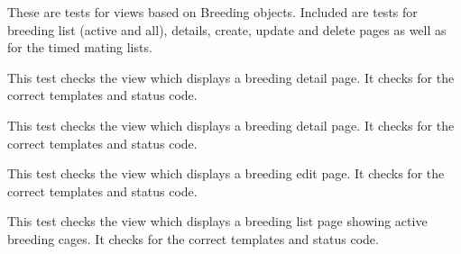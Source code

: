\documentclass[letterpaper,10pt,english]{sphinxmanual}
\begin{document}
\begin{fulllineitems}
\label{animals:mousedb.animal.tests.BreedingViewTests}
These are tests for views based on Breeding objects.  Included are tests for breeding list (active and all), details, create, update and delete pages as well as for the timed mating lists.

\begin{fulllineitems}
\label{animals:mousedb.animal.tests.BreedingViewTests.test_breeding_delete}
This test checks the view which displays a breeding detail page.  It checks for the correct templates and status code.

\end{fulllineitems}


\begin{fulllineitems}
\label{animals:mousedb.animal.tests.BreedingViewTests.test_breeding_detail}
This test checks the view which displays a breeding detail page.  It checks for the correct templates and status code.

\end{fulllineitems}


\begin{fulllineitems}
\label{animals:mousedb.animal.tests.BreedingViewTests.test_breeding_edit}
This test checks the view which displays a breeding edit page.  It checks for the correct templates and status code.

\end{fulllineitems}


\begin{fulllineitems}
\label{animals:mousedb.animal.tests.BreedingViewTests.test_breeding_list}
This test checks the view which displays a breeding list page showing active breeding cages.  It checks for the correct templates and status code.


\end{fulllineitems}
\end{fulllineitems}
\end{document}
